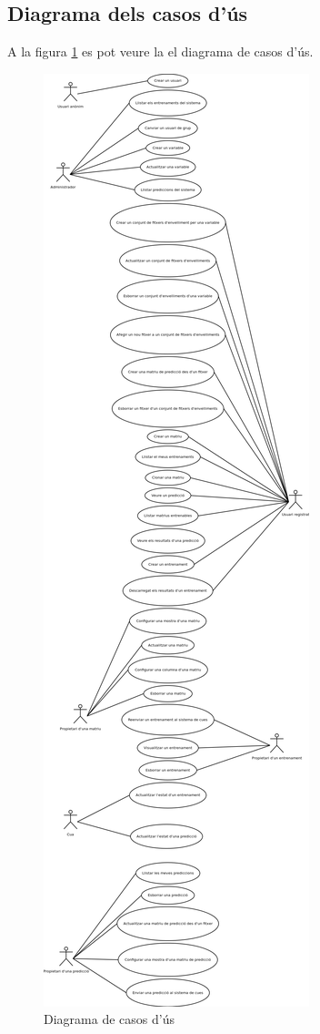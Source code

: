 \subsection{Diagrama dels casos d'\'{u}s}
A la figura \ref{fig:usecases} es pot veure la el diagrama de casos d'\'{u}s.
\begin{figure}[h]
  \centering
  \includegraphics[scale=0.2]{img/specification/UsesCases.png}
  \caption{Diagrama de casos d'\'{u}s}
  \label{fig:usecases}
\end{figure}

